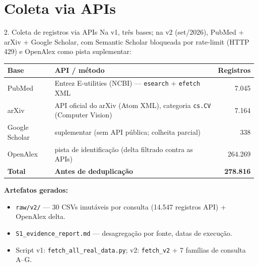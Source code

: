 \documentclass[aspectratio=169]{beamer}
\begin{document}
\section{Coleta via APIs}
\begin{frame}{2. Coleta de registros via APIs}
\small
Na v1, três bases; na v2 (set/2026), PubMed + arXiv + Google Scholar, com Semantic Scholar bloqueada por rate-limit (HTTP 429) e OpenAlex como pista suplementar:
\begin{table}
\centering
\begin{tabular}{>{\raggedright\arraybackslash}p{2.8cm} >{\raggedright\arraybackslash}p{6cm} r}
\toprule
\textbf{Base} & \textbf{API / método} & \textbf{Registros} \\
\midrule
PubMed & Entrez E-utilities (NCBI) --- \texttt{esearch} + \texttt{efetch} XML & 7.045 \\
arXiv & API oficial do arXiv (Atom XML), categoria \texttt{cs.CV} (Computer Vision) & 7.164 \\
Google Scholar & suplementar (sem API pública; colheita parcial) & 338 \\
OpenAlex & pista de identificação (delta filtrado contra as APIs) & 264.269 \\
\midrule
\textbf{Total} & \textbf{Antes de deduplicação} & \textbf{278.816} \\
\bottomrule
\end{tabular}
\end{table}

\vspace{0.3em}
\textbf{Artefatos gerados:}
\begin{itemize}
	\item \texttt{raw/v2/} --- 30 CSVs imutáveis por consulta (14.547 registros API) + OpenAlex delta.
	\item \texttt{S1\_evidence\_report.md} --- desagregação por fonte, datas de execução.
	\item Script v1: \texttt{fetch\_all\_real\_data.py}; v2: \texttt{fetch\_v2} + 7 famílias de consulta A--G.
\end{itemize}
\end{frame}

\end{document}
